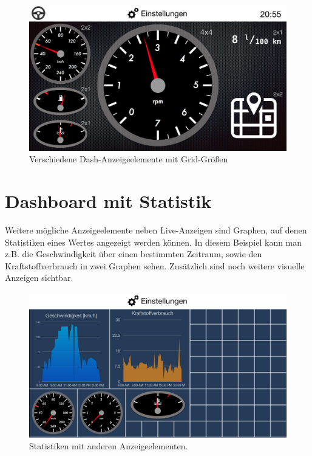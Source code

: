 \documentclass[pflichtenheft.tex]{subfiles}
\begin{document}
\begin{figure}[H]
  	\begin{center}
 		\includegraphics[width=\textwidth]{Images/GUI-DashboardSize.png}
  		\caption{Verschiedene Dash-Anzeigeelemente mit Grid-Größen}
  	\end{center}
\end{figure}

\clearpage
\section{Dashboard mit Statistik}

Weitere mögliche Anzeigeelemente neben Live-Anzeigen sind Graphen, auf denen Statistiken eines Wertes angezeigt werden können. In diesem Beispiel kann man z.B. die Geschwindigkeit über einen bestimmten Zeitraum, sowie den Kraftstoffverbrauch in zwei Graphen sehen. Zusätzlich sind noch weitere visuelle Anzeigen sichtbar.
\begin{figure}[H]
  	\begin{center}
 		\includegraphics[width=\textwidth]{Images/GUI-DashboardStatistic.png}
  		\caption{Statistiken mit anderen Anzeigeelementen.}
  	\end{center}
\end{figure}
\end{document}
